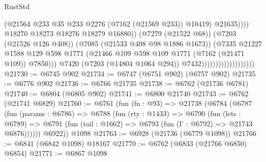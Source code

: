 \begin{lexlean}{RustStd}
\begin{coremodule}
                                                        (@21564
                                                          @233
                                                          @35
                                                          @233
                                                          @2276
                                                          (@7162 (@21569 @233))
                                                          @10419)
                                                        @21635))))
                                                @18270
                                                @18273
                                                @18276
                                                @18279
                                                @16880))
                                            (@7279 (@21522 @68))
                                            (@7203 (@21526 @126 @408))
                                            (@7085 (@21533 @408 @98 @1886 @1673))
                                            (@7335
                                              @21227
                                              @1588
                                              @129
                                              @598
                                              @1771
                                              (@21466
                                                @109
                                                @598
                                                @109
                                                @1771
                                                (@7162 (@21471 @109))
                                                @7850)))
                                          @7420
                                          (@7203 (@14804 @1064 @294))
                                          @7432)))))))))))))))))))
@21730 := @6745 @902
@21734 := @6747 (@6751 @902) (@6757 @902)
@21735 := @6776 @902
@21736 := @6766 @21735
@21738 := @6762 (@21736 @6781)
@21740 := @6804 (@6805 @902)
@21741 := @6800 @21740
@21743 := @6762 (@21741 @6829)
@21760 := @6761
    (fun (fn : @93) =>
    @21738
      (@6784
        (@6787
          (fun (params : @6786) =>
          @6788
            (fun (rty : @1433) =>
            @6790
              (fun (lets : @6789) =>
              @6791 (fun (tail : @1662) => @6793 (fun (Γ : @6792) => @21743 @6876))))))
        @6922))
    @1098
@21763 := @6928 (@21736 (@6779 @1098))
@21766 := @6841 (@6842 @1098) @18167
@21770 := @6762 (@6833 (@21766 @6850) @6854)
@21771 := @6867 @1098

\end{coremodule}
\end{lexlean}
